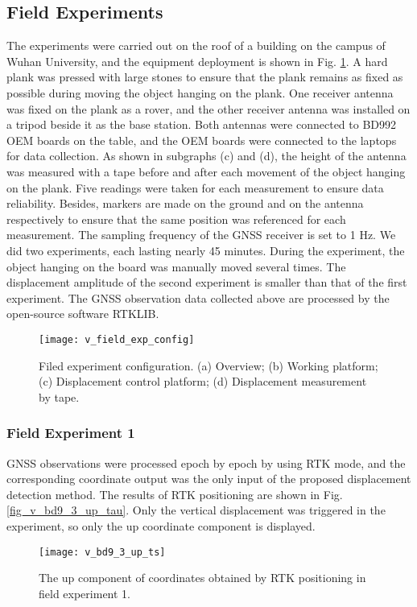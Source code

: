 \documentclass[final,3p,times]{elsarticle}
\begin{document}
	\subsection{Field Experiments}
	The experiments were carried out on the roof of a building on the campus of Wuhan University, and the equipment deployment is shown in Fig. \ref{fig_v_field_exp_config}. 
	A hard plank was pressed with large stones to ensure that the plank remains as fixed as possible during moving the object hanging on the plank. 
	One receiver antenna was fixed on the plank as a rover, and the other receiver antenna was installed on a tripod beside it as the base station. 
	Both antennas were connected to BD992 OEM boards on the table, and the OEM boards were connected to the laptops for data collection. 
	As shown in subgraphs (c) and (d), the height of the antenna was measured with a tape before and after each movement of the object hanging on the plank. 
	Five readings were taken for each measurement to ensure data reliability.
	Besides, markers are made on the ground and on the antenna respectively to ensure that the same position was referenced for each measurement. 
	The sampling frequency of the GNSS receiver is set to 1 Hz. 
	We did two experiments, each lasting nearly 45 minutes. 
	During the experiment, the object hanging on the board was manually moved several times.
	The displacement amplitude of the second experiment is smaller than that of the first experiment.
	The GNSS observation data collected above are processed by the open-source software RTKLIB\cite{takasu2011rtklib}. 
	\begin{figure}[htbp]
		\centering
		\texttt{[image: v\_field\_exp\_config]}
		\caption{Filed experiment configuration. (a) Overview; (b) Working platform; (c) Displacement control platform; (d) Displacement measurement by tape. }
		\label{fig_v_field_exp_config}
	\end{figure} 
	
	\subsubsection{Field Experiment 1}
	GNSS observations were processed epoch by epoch by using RTK mode, and the corresponding coordinate output was the only input of the proposed displacement detection method.
	The results of RTK positioning are shown in Fig. \ref{fig_v_bd9_3_up_tau}.
	Only the vertical displacement was triggered in the experiment, so only the up coordinate component is displayed. 
	\begin{figure}[htbp]
		\centering
		\texttt{[image: v\_bd9\_3\_up\_ts]}
		\caption{The up component of coordinates obtained by RTK positioning in field experiment 1.}
		\label{fig_v_bd9_3_up_ts}
	\end{figure} 
	
\end{document}
